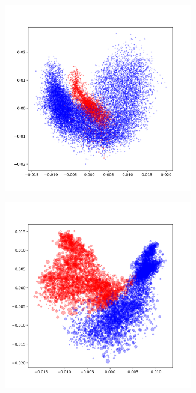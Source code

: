 \begin{description}[leftmargin=0pt]
    \begin{figure}[ht]
    \centering
    \begin{subfigure}{0.45\textwidth}
        \centering
        \includegraphics[width=0.9\textwidth]{Figures/Methods/ubFashion-latentspace-vis.png}
    \end{subfigure}
    \hfill
    \begin{subfigure}{0.45\textwidth}
        \centering
        \includegraphics[width=0.9\textwidth]{Figures/Methods/RLS-ubFashion-latentspace-vis.png}

\end{subfigure}
\end{figure}
\end{description}
